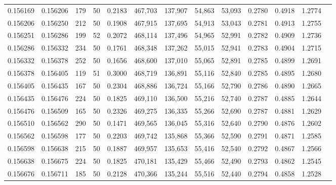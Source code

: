 \begin{tabular}{rrrrrrrrrrrrr}
0.156169 & 0.156206 &   179 &  50 &                                     0.2183 & 467,703 & 137,907 &  54,863 &  53,093 & 0.2780 & 0.4918 & 1.2774 \\
0.156206 & 0.156250 &   212 &  50 &                                     0.1908 & 467,915 & 137,695 &  54,913 &  53,043 & 0.2781 & 0.4913 & 1.2755 \\
0.156251 & 0.156286 &   199 &  52 &                                     0.2072 & 468,114 & 137,496 &  54,965 &  52,991 & 0.2782 & 0.4909 & 1.2736 \\
0.156286 & 0.156332 &   234 &  50 &                                     0.1761 & 468,348 & 137,262 &  55,015 &  52,941 & 0.2783 & 0.4904 & 1.2715 \\
0.156332 & 0.156378 &   252 &  50 &                                     0.1656 & 468,600 & 137,010 &  55,065 &  52,891 & 0.2785 & 0.4899 & 1.2691 \\
0.156378 & 0.156405 &   119 &  51 &                                     0.3000 & 468,719 & 136,891 &  55,116 &  52,840 & 0.2785 & 0.4895 & 1.2680 \\
0.156405 & 0.156435 &   167 &  50 &                                     0.2304 & 468,886 & 136,724 &  55,166 &  52,790 & 0.2786 & 0.4890 & 1.2665 \\
0.156435 & 0.156476 &   224 &  50 &                                     0.1825 & 469,110 & 136,500 &  55,216 &  52,740 & 0.2787 & 0.4885 & 1.2644 \\
0.156476 & 0.156509 &   165 &  50 &                                     0.2326 & 469,275 & 136,335 &  55,266 &  52,690 & 0.2787 & 0.4881 & 1.2629 \\
0.156510 & 0.156562 &   290 &  50 &                                     0.1471 & 469,565 & 136,045 &  55,316 &  52,640 & 0.2790 & 0.4876 & 1.2602 \\
0.156562 & 0.156598 &   177 &  50 &                                     0.2203 & 469,742 & 135,868 &  55,366 &  52,590 & 0.2791 & 0.4871 & 1.2585 \\
0.156598 & 0.156638 &   215 &  50 &                                     0.1887 & 469,957 & 135,653 &  55,416 &  52,540 & 0.2792 & 0.4867 & 1.2566 \\
0.156638 & 0.156675 &   224 &  50 &                                     0.1825 & 470,181 & 135,429 &  55,466 &  52,490 & 0.2793 & 0.4862 & 1.2545 \\
0.156676 & 0.156711 &   185 &  50 &                                     0.2128 & 470,366 & 135,244 &  55,516 &  52,440 & 0.2794 & 0.4858 & 1.2528 \\

\end{tabular}
